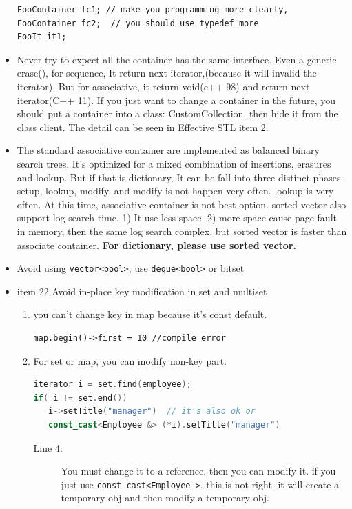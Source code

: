 \documentclass[a4paper,11pt,twoside]{book}
\begin{document}
\begin{itemize}
\begin{lstlisting}[numbers=none]
FooContainer fc1; // make you programming more clearly,
FooContainer fc2;  // you should use typedef more
FooIt it1;
\end{lstlisting}

\item Never try to expect all the container has the same interface. Even a generic erase(), for sequence, It return next iterator,(because it will invalid the iterator).   But for associative, it return void(c++ 98) and return next iterator(C++ 11). If you just want to change a container in the future, you should put a container into a class: CustomCollection. then hide it from the class client. The detail can be seen in Effective STL item 2.

\item The standard associative container are implemented as balanced binary search trees.  It's optimized for a mixed combination of insertions, erasures and lookup.  But if that is dictionary, It can be fall into three distinct phases. setup, lookup, modify. and modify is not happen very often. lookup is very often. At this time, associative container is not best option. sorted vector also support log search time.  1) It use less space. 2) more space cause page fault in memory, then the same log search complex, but sorted vector is faster than associate container.\textbf{ For dictionary, please use sorted vector.}


\item Avoid using \texttt{vector<bool>}, use \texttt{deque<bool>} or bitset


\item item 22 Avoid in-place key modification in set and multiset
\begin{enumerate}
   \item you can't change key in map because it's const default.
\begin{lstlisting}[numbers=none]
map.begin()->first = 10 //compile error
\end{lstlisting}

   \item For set or map, you can modify non-key part.
\begin{lstlisting}[frame=single, language=c++]
iterator i = set.find(employee);
if( i != set.end())
   i->setTitle("manager")  // it's also ok or
   const_cast<Employee &> (*i).setTitle("manager")
\end{lstlisting}
\begin{description}
	\item[Line 4:]  You must change it to a reference, then you can modify it. if you just use \texttt{const\_cast<Employee >}. this is not right. it will create a temporary obj and then modify a temporary obj.
\end{description}


\end{enumerate}
\end{itemize}
\end{document}
